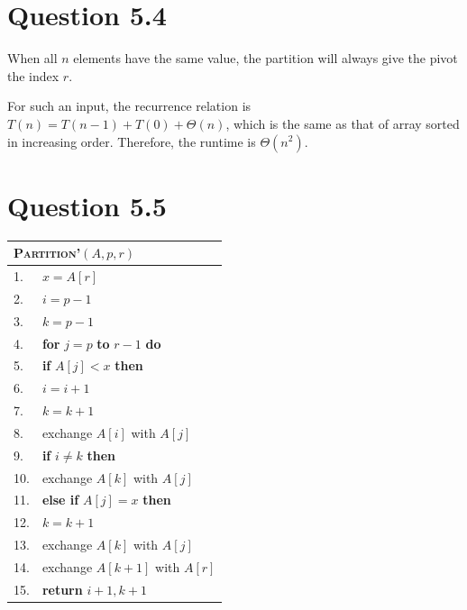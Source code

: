 \documentclass[a4paper,12pt]{article}
\begin{document}
\section*{Question 5.4}

When all $n$ elements have the same value, the partition will always give the pivot the index $r$.

For such an input, the recurrence relation is $T(n) = T(n - 1) + T(0) + \Theta(n)$, which is the same as that of array sorted in increasing order.
Therefore, the runtime is $\Theta(n^2)$.

\section*{Question 5.5}
\begin{minipage}{0.5\textwidth}
	\begin{center}
		\begin{tabular}{ll}
			\toprule
			\multicolumn{2}{l}{\textsc{Partition'}$(A,p,r)$}\\
			\midrule
			1. & $x = A[r]$\\
			2. & $i = p - 1$\\
			3. & $k = p - 1$\\
			4. & \textbf{for} $j = p$ \textbf{to} $r - 1$ \textbf{do}\\
			5. & \qquad \textbf{if} $A[j] < x$ \textbf{then}\\
			6. & \qquad \qquad $i = i + 1$\\
			7. & \qquad \qquad $k = k + 1$\\
			8. & \qquad \qquad exchange $A[i]$ with $A[j]$\\
			9. & \qquad \qquad \textbf{if} $i \neq k$ \textbf{then}\\
			10. & \qquad \qquad \qquad exchange $A[k]$ with $A[j]$\\
			11. & \qquad \textbf{else if} $A[j] = x$ \textbf{then}\\
			12. & \qquad \qquad $k = k + 1$\\
			13. & \qquad \qquad exchange $A[k]$ with $A[j]$\\
			14. & exchange $A[k + 1]$ with $A[r]$\\
			15. & \textbf{return} $i + 1, k + 1$\\
			\bottomrule
		\end{tabular}
	\end{center}
\end{minipage}
\end{document}
